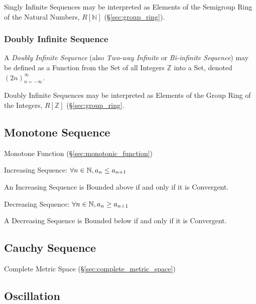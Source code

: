Singly Infinite Sequences may be interpreted as Elements of the
Semigroup Ring of the Natural Numbers, $R[\mathbb{N}]$
(\S\ref{sec:group_ring}).



\subsubsection{Doubly Infinite Sequence}\label{sec:doubly_infinite}

A \emph{Doubly Infinite Sequence} (also \emph{Two-way Infinite} or
\emph{Bi-infinite Sequence}) may be defined as a Function from the Set
of all Integers $\mathbb{Z}$ into a Set, denoted
$(2n)^{\infty}_{n=-\infty}$.

Doubly Infinite Sequences may be interpreted as Elements of the Group
Ring of the Integers, $R[\mathbb{Z}]$ (\S\ref{sec:group_ring}.



\subsection{Monotone Sequence}\label{sec:monotone_sequence}

Monotone Function (\S\ref{sec:monotonic_function})

Increasing Sequence: $\forall n \in \mathbb{N}, a_n \leq a_{n+1}$

An Increasing Sequence is Bounded above if and only if it is
Convergent.

Decreasing Sequence: $\forall n \in \mathbb{N}, a_n \geq a_{n+1}$

A Decreasing Sequence is Bounded below if and only if it is
Convergent.



\subsection{Cauchy Sequence}\label{sec:cauchy_sequence}

Complete Metric Space (\S\ref{sec:complete_metric_space})



\subsection{Oscillation}\label{sec:oscillation}



